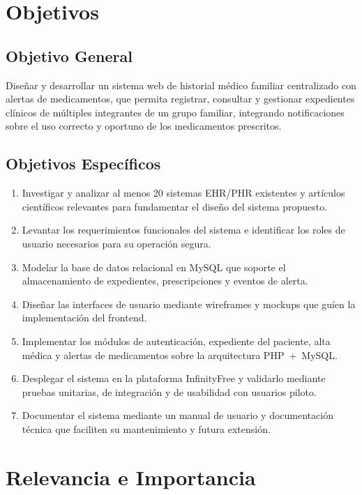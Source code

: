 \documentclass[12pt, letterpaper]{report}
\begin{document}
\section{Objetivos}

\subsection{Objetivo General}

Diseñar y desarrollar un sistema web de historial médico familiar centralizado con
alertas de medicamentos, que permita registrar, consultar y gestionar expedientes
clínicos de múltiples integrantes de un grupo familiar, integrando notificaciones
sobre el uso correcto y oportuno de los medicamentos prescritos.

\subsection{Objetivos Específicos}

\begin{enumerate}[label=\arabic*.]
  \item Investigar y analizar al menos 20 sistemas EHR/PHR existentes y artículos
        científicos relevantes para fundamentar el diseño del sistema propuesto.
  \item Levantar los requerimientos funcionales del sistema e identificar los roles
        de usuario necesarios para su operación segura.
  \item Modelar la base de datos relacional en MySQL que soporte el almacenamiento
        de expedientes, prescripciones y eventos de alerta.
  \item Diseñar las interfaces de usuario mediante wireframes y mockups que guíen
        la implementación del frontend.
  \item Implementar los módulos de autenticación, expediente del paciente, alta
        médica y alertas de medicamentos sobre la arquitectura PHP~+~MySQL.
  \item Desplegar el sistema en la plataforma InfinityFree y validarlo mediante
        pruebas unitarias, de integración y de usabilidad con usuarios piloto.
  \item Documentar el sistema mediante un manual de usuario y documentación técnica
        que faciliten su mantenimiento y futura extensión.
\end{enumerate}

\section{Relevancia e Importancia}
\end{document}
